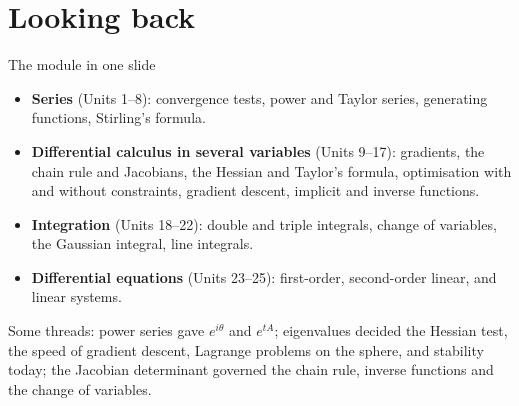 \documentclass[10pt]{wosm-slides}
\begin{document}

\section{Looking back}

\begin{frame}{The module in one slide}
  \begin{itemize}
    \item \textbf{Series} (Units 1--8): convergence tests, power and Taylor series, generating functions,
      Stirling's formula.
    \item \textbf{Differential calculus in several variables} (Units 9--17): gradients, the chain rule
      and Jacobians, the Hessian and Taylor's formula, optimisation with and without constraints,
      gradient descent, implicit and inverse functions.
    \item \textbf{Integration} (Units 18--22): double and triple integrals, change of variables, the
      Gaussian integral, line integrals.
    \item \textbf{Differential equations} (Units 23--25): first-order, second-order linear, and linear
      systems.
  \end{itemize}
  \pause
  {\small Some threads: power series gave $e^{i\theta}$ and $e^{tA}$; eigenvalues decided the Hessian test,
  the speed of gradient descent, Lagrange problems on the sphere, and stability today; the Jacobian
  determinant governed the chain rule, inverse functions and the change of variables.\par}
\end{frame}
\end{document}

